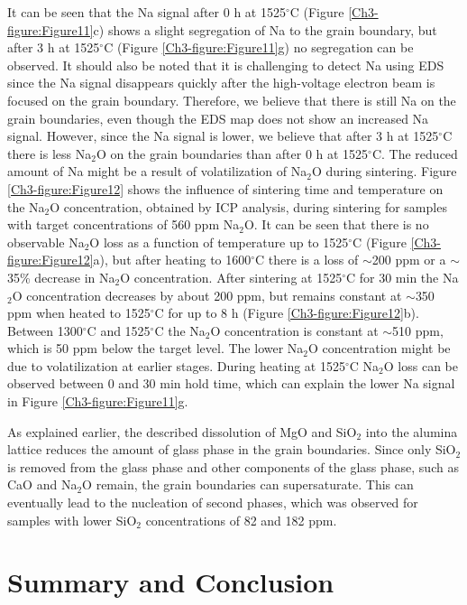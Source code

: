 It can be seen that the Na signal after 0 h at 1525$^{\circ}$C (Figure \ref{Ch3-figure:Figure11}c) shows a slight segregation of Na to the grain boundary, but after 3 h at 1525$^{\circ}$C (Figure \ref{Ch3-figure:Figure11}g) no segregation can be observed. It should also be noted that it is challenging to detect Na using EDS since the Na signal disappears quickly after the high-voltage electron beam is focused on the grain boundary. Therefore, we believe that there is still Na on the grain boundaries, even though the EDS map does not show an increased Na signal. However, since the Na signal is lower, we believe that after 3 h at 1525$^{\circ}$C there is less Na$_{2}$O on the grain boundaries than after 0 h at 1525$^{\circ}$C. The reduced amount of Na might be a result of volatilization of Na$_{2}$O during sintering. Figure \ref{Ch3-figure:Figure12} shows the influence of sintering time and temperature on the Na$_{2}$O concentration, obtained by ICP analysis, during sintering for samples with target concentrations of 560 ppm Na$_{2}$O. It can be seen that there is no observable Na$_{2}$O loss as a function of temperature up to 1525$^{\circ}$C (Figure \ref{Ch3-figure:Figure12}a), but after heating to 1600$^{\circ}$C there is a loss of $\sim$200 ppm or a $\sim$35\% decrease in Na$_{2}$O concentration. After sintering at 1525$^{\circ}$C for 30 min the Na$_{2}$O concentration decreases by about 200 ppm, but remains constant at $\sim$350 ppm when heated to 1525$^{\circ}$C for up to 8 h (Figure \ref{Ch3-figure:Figure12}b). Between 1300$^{\circ}$C and 1525$^{\circ}$C the Na$_{2}$O concentration is constant at $\sim$510 ppm, which is 50 ppm below the target level. The lower Na$_{2}$O concentration might be due to volatilization at earlier stages. During heating at 1525$^{\circ}$C Na$_{2}$O loss can be observed between 0 and 30 min hold time, which can explain the lower Na signal in Figure \ref{Ch3-figure:Figure11}g. 

As explained earlier, the described dissolution of MgO and SiO$_{2}$ into the alumina lattice reduces the amount of glass phase in the grain boundaries. Since only SiO$_{2}$ is removed from the glass phase and other components of the glass phase, such as CaO and Na$_{2}$O remain, the grain boundaries can supersaturate. This can eventually lead to the nucleation of second phases, which was observed for samples with lower SiO$_{2}$ concentrations of 82 and 182 ppm.

\section{Summary and Conclusion}

